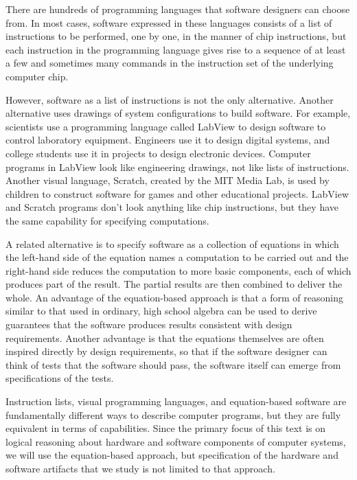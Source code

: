 There are hundreds of programming languages
that software designers can choose from.
In most cases, software expressed in these languages consists
of a list of instructions to be performed, one by one,
in the manner of chip instructions,
but each instruction in the programming language gives
rise to a sequence of at least a few and sometimes many
commands in the instruction set of the underlying computer chip.

However, software as a list of instructions is
not the only alternative.
Another alternative uses drawings of
system configurations to build software.
For example, scientists use a programming language called
LabView
to design software to control laboratory equipment.
Engineers use it to design digital systems,
and college students use it in projects to
design electronic devices.
Computer programs in LabView look like engineering drawings,
not like lists of instructions.
Another visual language,
Scratch, created by the MIT Media Lab,
is used by children to construct software for games
and other educational projects.
LabView and Scratch programs don't
look anything like chip instructions,
but they have the same capability for specifying computations.

A related alternative is to specify software as
a collection of equations in which
the left-hand side of the equation names a computation to be carried out
and the right-hand side reduces the computation to
more basic components, each of which produces part of the result.
The partial results are then combined to deliver the whole.
An advantage of the equation-based approach
is that a form of reasoning similar to that used
in ordinary, high school algebra can be used to derive
guarantees that the software produces results consistent
with design requirements.
Another advantage is that the equations themselves
are often inspired directly by design requirements,
so that if the software designer can think of tests
that the software should pass, the software itself
can emerge from specifications of the tests.

Instruction lists, visual programming languages, and equation-based
software are fundamentally different ways to describe computer programs,
but they are fully equivalent in terms of capabilities.
Since the primary focus of this text is on logical reasoning
about hardware and software components of computer systems,
we will use the equation-based approach,
but specification of the hardware and software artifacts that we study
is not limited to that approach.

